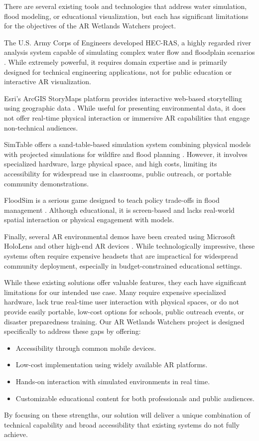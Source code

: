 There are several existing tools and technologies that address water simulation, flood modeling, or educational visualization, but each has significant limitations for the objectives of the AR Wetlands Watchers project.

The U.S. Army Corps of Engineers developed HEC-RAS, a highly regarded river analysis system capable of simulating complex water flow and floodplain scenarios \cite{HECRAS2024}. While extremely powerful, it requires domain expertise and is primarily designed for technical engineering applications, not for public education or interactive AR visualization.

Esri's ArcGIS StoryMaps platform provides interactive web-based storytelling using geographic data \cite{ArcGIS2024}. While useful for presenting environmental data, it does not offer real-time physical interaction or immersive AR capabilities that engage non-technical audiences.

SimTable offers a sand-table-based simulation system combining physical models with projected simulations for wildfire and flood planning \cite{SimTable2023}. However, it involves specialized hardware, large physical space, and high costs, limiting its accessibility for widespread use in classrooms, public outreach, or portable community demonstrations.

FloodSim is a serious game designed to teach policy trade-offs in flood management \cite{FloodSim2023}. Although educational, it is screen-based and lacks real-world spatial interaction or physical engagement with models.

Finally, several AR environmental demos have been created using Microsoft HoloLens and other high-end AR devices \cite{HoloLens2023}. While technologically impressive, these systems often require expensive headsets that are impractical for widespread community deployment, especially in budget-constrained educational settings.

While these existing solutions offer valuable features, they each have significant limitations for our intended use case. Many require expensive specialized hardware, lack true real-time user interaction with physical spaces, or do not provide easily portable, low-cost options for schools, public outreach events, or disaster preparedness training. Our AR Wetlands Watchers project is designed specifically to address these gaps by offering:

\begin{itemize}
\item Accessibility through common mobile devices.

\item Low-cost implementation using widely available AR platforms.

\item Hands-on interaction with simulated environments in real time.

\item Customizable educational content for both professionals and public audiences.
\end{itemize}

By focusing on these strengths, our solution will deliver a unique combination of technical capability and broad accessibility that existing systems do not fully achieve.